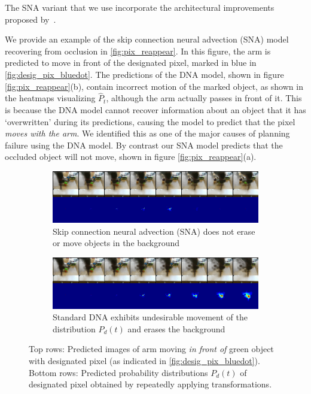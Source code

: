 The SNA variant that we use incorporate the architectural improvements proposed by~\cite{savp}.

We provide an example of the skip connection neural advection (SNA) model recovering from occlusion in \autoref{fig:pix_reappear}. In this figure, the arm is predicted to move in front of the designated pixel, marked in blue in \autoref{fig:desig_pix_bluedot}. The predictions of the DNA model, shown in figure \autoref{fig:pix_reappear}(b), contain incorrect motion of the marked object, as shown in the heatmaps visualizing $\hat{P}_t$, although the arm actually passes in front of it. This is because the DNA model cannot recover information about an object that it has `overwritten' during its predictions, causing the model to predict that the pixel \emph{moves with the arm}. We identified this as one of the major causes of planning failure using the DNA model. By contrast our SNA model predicts that the occluded object will not move, shown in figure  \autoref{fig:pix_reappear}(a).

\begin{figure}
	\centering
	\begin{subfigure}{0.9\columnwidth}
		\centering
		\includegraphics[width=1.\linewidth]{images_sna/occlusionaware/cdna_1ststep_bckgd_gen_pixb0_overtime.png}
		\caption{Skip connection neural advection (SNA) does not erase or move objects in the background}
		\label{fig:Ng1}
	\end{subfigure}
	\begin{subfigure}{0.9\columnwidth}
		\centering
		\includegraphics[width=1.0\linewidth]{images_sna/occlusionaware/orig_dna_gen_pixb0_overtime.png}
		\caption{Standard DNA \cite{foresight} exhibits undesirable movement of the distribution $P_{d}(t)$ and erases the background}
	\end{subfigure}
	\caption{
		Top rows: Predicted images of arm moving \textit{in front of} green object with designated pixel (as indicated in \autoref{fig:desig_pix_bluedot}). 
		Bottom rows: Predicted probability distributions $P_{d}(t)$ of designated pixel obtained by repeatedly applying transformations.}
	\label{fig:pix_reappear}
\end{figure}

